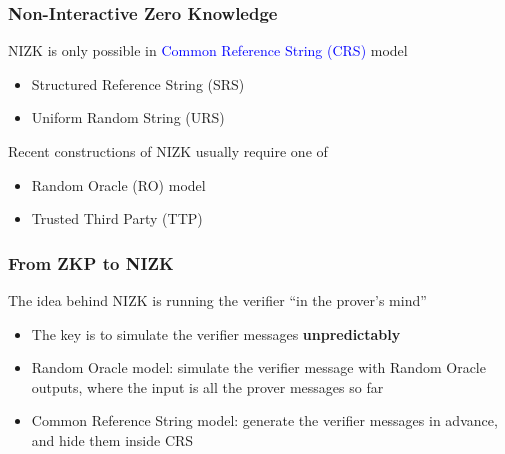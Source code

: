 \documentclass[handout]{beamer} %
\newcommand{\blue}[1]{\textcolor{blue}{#1}}
\begin{document}
\frame
{
  \frametitle{Non-Interactive Zero Knowledge}
  \onslide<+-> NIZK is only possible in \blue{Common Reference String (CRS)} model
  \begin{itemize}
    \item<+-> Structured Reference String (SRS)
    \item<+-> Uniform Random String (URS)
  \end{itemize}
  \onslide<+-> Recent constructions of NIZK usually require one of
  \begin{itemize}
    \item<+-> Random Oracle (RO) model
    \item<+-> Trusted Third Party (TTP)
  \end{itemize}

%
%
}

{
  \frametitle{From ZKP to NIZK}

  \onslide<+-> The idea behind NIZK is running the verifier ``in the prover's mind''

  \begin{itemize}
    \item<+-> The key is to simulate the verifier messages \textbf{unpredictably}
    \item<+-> Random Oracle model: simulate the verifier message with Random Oracle outputs, where the input is all the prover messages so far
    \item<+-> Common Reference String model: generate the verifier messages in advance, and hide them inside CRS
  \end{itemize}
}

\end{document}

